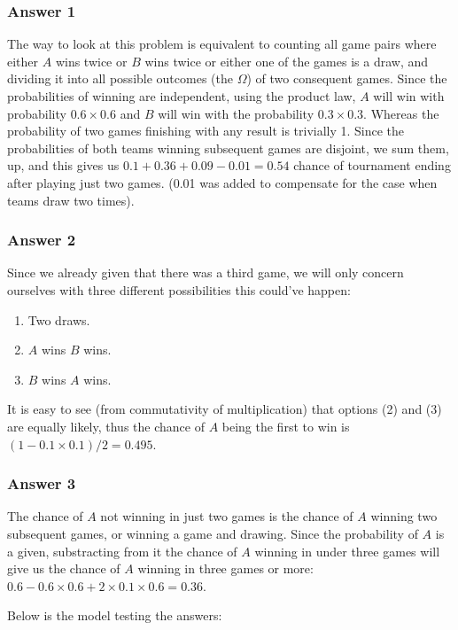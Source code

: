 \documentclass[11pt]{article}
\begin{document}
\subsubsection{Answer 1}
\label{sec-1-1-1}
The way to look at this problem is equivalent to counting all game pairs
where either $A$ wins twice or $B$ wins twice or either one of the games is
a draw, and dividing it into all possible outcomes (the $\Omega$) of two
consequent games.  Since the probabilities of winning are independent, using
the product law, $A$ will win with probability $0.6 \times 0.6$ and $B$ will
win with the probability $0.3 \times 0.3$.  Whereas the probability of two
games finishing with any result is trivially 1.  Since the probabilities of
both teams winning subsequent games are disjoint, we sum them, up, and this
gives us $0.1 + 0.36 + 0.09 - 0.01 = 0.54$ chance of tournament ending
after playing just two games.  (0.01 was added to compensate for the case
when teams draw two times).
\subsubsection{Answer 2}
\label{sec-1-1-2}
Since we already given that there was a third game, we will only concern
ourselves with three different possibilities this could've happen:
\begin{enumerate}
\item Two draws.
\item $A$ wins $B$ wins.
\item $B$ wins $A$ wins.
\end{enumerate}

It is easy to see (from commutativity of multiplication) that options (2)
and (3) are equally likely, thus the chance of $A$ being the first to
win is $(1 - 0.1 \times 0.1) / 2 = 0.495$.
\subsubsection{Answer 3}
\label{sec-1-1-3}
The chance of $A$ not winning in just two games is the chance of $A$ winning
two subsequent games, or winning a game and drawing.  Since the probability
of $A$ is a given, substracting from it the chance of $A$ winning in under
three games will give us the chance of $A$ winning in three games or more:
$0.6 - 0.6 \times 0.6 + 2 \times 0.1 \times 0.6 = 0.36$.

Below is the model testing the answers:
\end{document}

